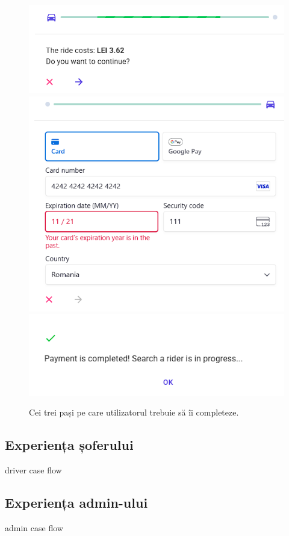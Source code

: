 \begin{figure}[H]
    \centering
    \includegraphics[width=14cm]{Assets/accept ride.png}
    \includegraphics[width=14cm]{Assets/card.png}
    \includegraphics[width=14cm]{Assets/donePayment.png}
    \caption{Cei trei pași pe care utilizatorul trebuie să îi completeze.}
    \label{fig:paymentSteps}
\end{figure}


\subsection{Experiența șoferului}
driver case flow
\subsection{Experiența admin-ului}
admin case flow